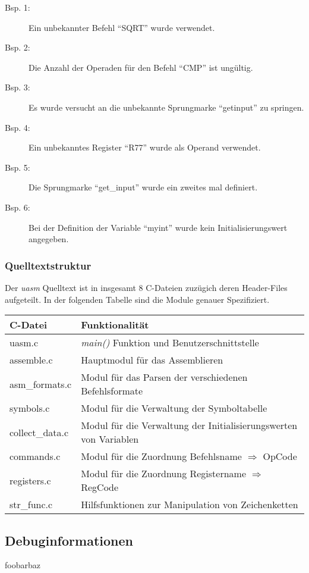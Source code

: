 \begin{description}
    \item[Bsp. 1:] Ein unbekannter Befehl ``SQRT'' wurde verwendet.
    \item[Bsp. 2:] Die Anzahl der Operaden für den Befehl ``CMP'' ist ungültig.
    \item[Bsp. 3:] Es wurde versucht an die unbekannte Sprungmarke ``getinput''
                   zu springen.
    \item[Bsp. 4:] Ein unbekanntes Register ``R77'' wurde als Operand verwendet.
    \item[Bsp. 5:] Die Sprungmarke ``get\_input'' wurde ein zweites mal
                   definiert.
    \item[Bsp. 6:] Bei der Definition der Variable ``myint'' wurde kein
                   Initialisierungswert angegeben.
\end{description}

\subsubsection{Quelltextstruktur}

Der \emph{uasm} Quelltext ist in insgesamt 8 C-Dateien zuzügich deren
Header-Files aufgeteilt. In der folgenden Tabelle sind die Module genauer
Spezifiziert.

\begin{center}
\begin{tabular}{ll}
C-Datei      & Funktionalität \\
\hline\hline
uasm.c          & \emph{main()} Funktion und Benutzerschnittstelle           \\
assemble.c      & Hauptmodul für das Assemblieren                            \\
asm\_formats.c  & Modul für das Parsen der verschiedenen Befehlsformate      \\
symbols.c       & Modul für die Verwaltung der Symboltabelle                 \\
collect\_data.c & Modul für die Verwaltung der Initialisierungswerten von Variablen \\
commands.c      & Modul für die Zuordnung Befehlsname $\Rightarrow$ OpCode   \\
registers.c     & Modul für die Zuordnung Registername $\Rightarrow$ RegCode \\
str\_func.c     & Hilfsfunktionen zur Manipulation von Zeichenketten         \\
\end{tabular}
\end{center}

\subsection{Debuginformationen}

foobarbaz
